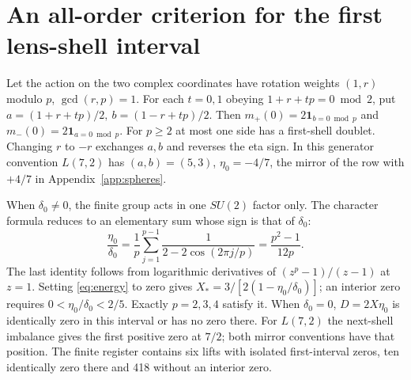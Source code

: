 \section{An all-order criterion for the first lens-shell interval}\label{app:energy}
Let the action on the two complex coordinates have rotation weights \((1,r)\) modulo \(p\), \(\gcd(r,p)=1\). For each \(t=0,1\) obeying \(1+r+tp=0\bmod2\), put \(a=(1+r+tp)/2,\ b=(1-r+tp)/2\). Then \(m_+(0)=2\mathbf1_{b=0\bmod p}\) and \(m_-(0)=2\mathbf1_{a=0\bmod p}\). For \(p\ge2\) at most one side has a first-shell doublet. Changing \(r\) to \(-r\) exchanges \(a,b\) and reverses the eta sign. In this generator convention \(L(7,2)\) has \((a,b)=(5,3)\), \(\eta_0=-4/7\), the mirror of the row with \(+4/7\) in Appendix~\ref{app:spheres}.

When \(\delta_0\ne0\), the finite group acts in one \(SU(2)\) factor only. The character formula reduces to an elementary sum whose sign is that of \(\delta_0\):
\[
 \frac{\eta_0}{\delta_0}=\frac1p\sum_{j=1}^{p-1}
                 \frac1{2-2\cos(2\pi j/p)}=\frac{p^2-1}{12p}.
\]
The last identity follows from logarithmic derivatives of \((z^p-1)/(z-1)\) at \(z=1\). Setting \eqref{eq:energy} to zero gives \(X_*=3/[2(1-\eta_0/\delta_0)]\); an interior zero requires \(0<\eta_0/\delta_0<2/5\). Exactly \(p=2,3,4\) satisfy it. When \(\delta_0=0\), \(D=2X\eta_0\) is identically zero in this interval or has no zero there. For \(L(7,2)\) the next-shell imbalance gives the first positive zero at \(7/2\); both mirror conventions have that position. The finite register contains six lifts with isolated first-interval zeros, ten identically zero there and 418 without an interior zero.
